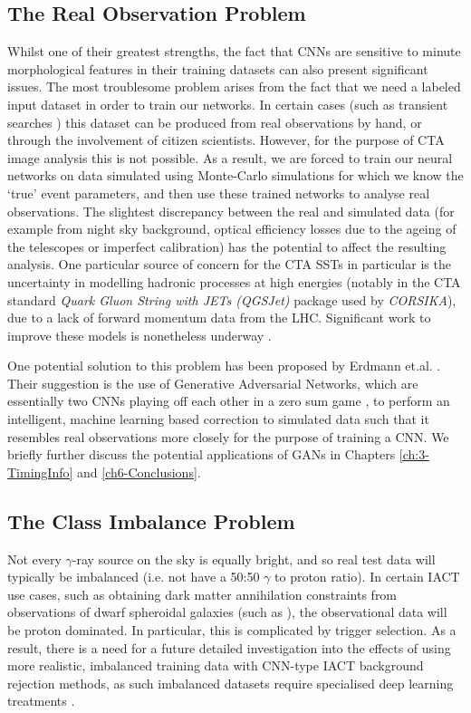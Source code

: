 \subsection{The Real Observation Problem}
Whilst one of their greatest strengths, the fact that CNNs are sensitive to minute morphological features in their training datasets can also present significant issues. The most troublesome problem arises from the fact that we need a labeled input dataset in order to train our networks. In certain cases (such as transient searches \cite{SNH}) this dataset can be produced from real observations by hand, or through the involvement of citizen scientists. However, for the purpose of CTA image analysis this is not possible. As a result, we are forced to train our neural networks on data simulated using Monte-Carlo simulations for which we know the `true' event parameters, and then use these trained networks to analyse real observations. The slightest discrepancy between the real and simulated data (for example from night sky background, optical efficiency losses due to the ageing of the telescopes or imperfect calibration) has the potential to affect the resulting analysis. One particular source of concern for the CTA SSTs in particular is the uncertainty in modelling hadronic processes at high energies (notably in the CTA standard \textit{Quark Gluon String with JETs (QGSJet)} package used by \textit{CORSIKA}), due to a lack of forward momentum data from the LHC. Significant work to improve these models is nonetheless underway \cite{hadronmodel}.

One potential solution to this problem has been proposed by Erdmann et.al. \cite{ErdmannAuger}. Their suggestion is the use of Generative Adversarial Networks, which are essentially two CNNs playing off each other in a zero sum game \cite{goodfellow2016deep}, to perform an intelligent, machine learning based correction to simulated data such that it resembles real observations more closely for the purpose of training a CNN. We briefly further discuss the potential applications of GANs in Chapters \ref{ch:3-TimingInfo} and \ref{ch6-Conclusions}.

\subsection{The Class Imbalance Problem}

Not every $\gamma$-ray source on the sky is equally bright, and so real test data will typically be imbalanced (i.e. not have a 50:50 $\gamma$ to proton ratio). In certain IACT use cases, such as obtaining dark matter annihilation constraints from observations of dwarf spheroidal galaxies (such as \cite{gloryduck}), the observational data will be proton dominated. In particular, this is complicated by trigger selection. As a result, there is a need for a future detailed investigation into the effects of using more realistic, imbalanced training data with CNN-type IACT background rejection methods, as such imbalanced datasets require specialised deep learning treatments \cite{imbalance}.

